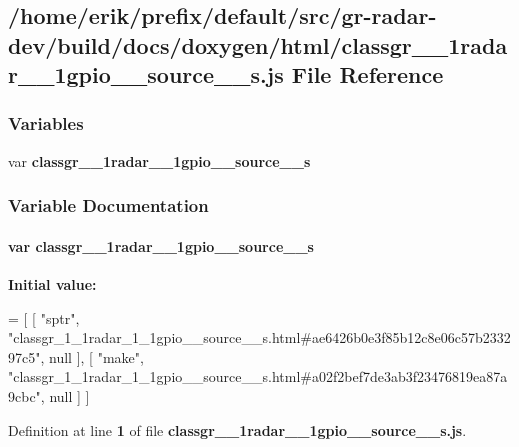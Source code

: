 \subsection{/home/erik/prefix/default/src/gr-\/radar-\/dev/build/docs/doxygen/html/classgr\+\_\+\_\+1radar\+\_\+\_\+1gpio\+\_\+\+\_\+source\+\_\+\+\_\+s.js File Reference}
\label{classgr__1__1radar__1__1gpio____source____s_8js}
\subsubsection*{Variables}
\begin{DoxyCompactItemize}
\item 
var {\bf classgr\+\_\+\_\+1radar\+\_\+\_\+1gpio\+\_\+\+\_\+source\+\_\+\+\_\+s}
\end{DoxyCompactItemize}


\subsubsection{Variable Documentation}
\paragraph[{classgr\+\_\+1\+\_\+1radar\+\_\+1\+\_\+1gpio\+\_\+\+\_\+source\+\_\+\+\_\+s}]{\setlength{\rightskip}{0pt plus 5cm}var classgr\+\_\+\_\+1radar\+\_\+\_\+1gpio\+\_\+\+\_\+source\+\_\+\+\_\+s}\label{classgr__1__1radar__1__1gpio____source____s_8js_a109089cfa99b8255bbe750dfa9a3c70a}
{\bfseries Initial value\+:}
\begin{DoxyCode}
=
[
    [ \textcolor{stringliteral}{"sptr"}, \textcolor{stringliteral}{"classgr\_1\_1radar\_1\_1gpio\_\_source\_\_s.html#ae6426b0e3f85b12c8e06c57b233297c5"}, null ],
    [ \textcolor{stringliteral}{"make"}, \textcolor{stringliteral}{"classgr\_1\_1radar\_1\_1gpio\_\_source\_\_s.html#a02f2bef7de3ab3f23476819ea87a9cbc"}, null ]
]
\end{DoxyCode}


Definition at line {\bf 1} of file {\bf classgr\+\_\+\_\+1radar\+\_\+\_\+1gpio\+\_\+\+\_\+source\+\_\+\+\_\+s.\+js}.

